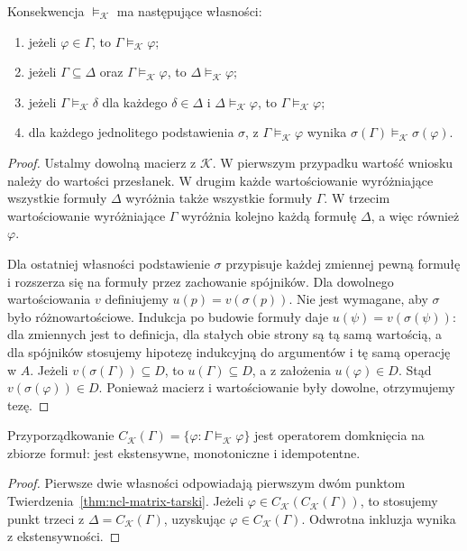 \begin{twierdzenie}
\label{thm:ncl-matrix-tarski}
Konsekwencja $\models_{\mathcal K}$ ma następujące własności:
\begin{enumerate}
\item jeżeli $\varphi\in\Gamma$, to
      $\Gamma\models_{\mathcal K}\varphi$;
\item jeżeli $\Gamma\subseteq\Delta$ oraz
      $\Gamma\models_{\mathcal K}\varphi$, to
      $\Delta\models_{\mathcal K}\varphi$;
\item jeżeli $\Gamma\models_{\mathcal K}\delta$ dla
      każdego $\delta\in\Delta$ i
      $\Delta\models_{\mathcal K}\varphi$, to
      $\Gamma\models_{\mathcal K}\varphi$;
\item dla każdego jednolitego podstawienia $\sigma$,
      z $\Gamma\models_{\mathcal K}\varphi$ wynika
      $\sigma(\Gamma)\models_{\mathcal K}\sigma(\varphi)$.
\end{enumerate}
\end{twierdzenie}
\begin{proof}
Ustalmy dowolną macierz z $\mathcal K$. W pierwszym
przypadku wartość wniosku należy do wartości przesłanek.
W drugim każde wartościowanie wyróżniające wszystkie
formuły $\Delta$ wyróżnia także wszystkie formuły $\Gamma$.
W trzecim wartościowanie wyróżniające $\Gamma$ wyróżnia
kolejno każdą formułę $\Delta$, a więc również $\varphi$.

Dla ostatniej własności podstawienie $\sigma$ przypisuje
każdej zmiennej pewną formułę i rozszerza się na formuły
przez zachowanie spójników. Dla dowolnego wartościowania
$v$ definiujemy $u(p)=v(\sigma(p))$.
Nie jest wymagane, aby $\sigma$ było różnowartościowe. Indukcja po budowie
formuły daje $u(\psi)=v(\sigma(\psi))$: dla zmiennych
jest to definicja, dla stałych obie strony są tą samą
wartością, a dla spójników stosujemy hipotezę indukcyjną
do argumentów i tę samą operację w $A$.
Jeżeli $v(\sigma(\Gamma))\subseteq D$, to
$u(\Gamma)\subseteq D$, a z założenia $u(\varphi)\in D$.
Stąd $v(\sigma(\varphi))\in D$. Ponieważ macierz
i wartościowanie były dowolne, otrzymujemy tezę.
\end{proof}

\begin{wniosek}\label{cor:ncl-matrix-closure}
Przyporządkowanie
$C_{\mathcal K}(\Gamma)=\{\varphi:\Gamma\models_{\mathcal K}\varphi\}$
jest operatorem domknięcia na zbiorze formuł:
jest ekstensywne, monotoniczne i idempotentne.
\end{wniosek}
\begin{proof}
Pierwsze dwie własności odpowiadają pierwszym dwóm
punktom Twierdzenia~\ref{thm:ncl-matrix-tarski}.
Jeżeli $\varphi\in C_{\mathcal K}(C_{\mathcal K}(\Gamma))$,
to stosujemy punkt trzeci z $\Delta=C_{\mathcal K}(\Gamma)$,
uzyskując $\varphi\in C_{\mathcal K}(\Gamma)$.
Odwrotna inkluzja wynika z ekstensywności.
\end{proof}

